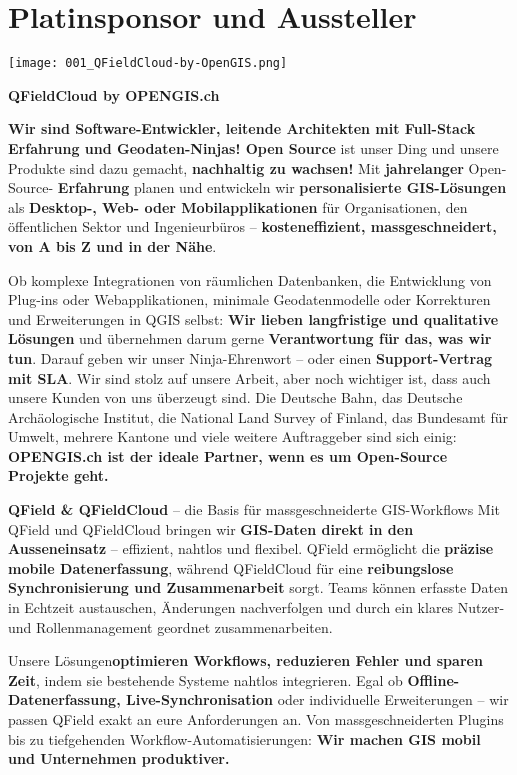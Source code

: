 \cleardoubleevenpage
\section*{Platinsponsor und Aussteller}
\begin{flushright}
\texttt{[image: 001\_QFieldCloud-by-OpenGIS.png]}
\end{flushright}
\vspace{0.5cm}

\noindent
    {\bfseries QFieldCloud by OPENGIS.ch}
    \vspace{1.0\baselineskip}
    
 \noindent   
    {\bfseries Wir sind Software-Entwickler, leitende Architekten mit Full-Stack Erfahrung und Geodaten-Ninjas!
      Open Source} ist unser Ding und unsere Produkte sind dazu gemacht,  {\bfseries nachhaltig zu wachsen!}
    Mit {\bfseries jahrelanger} Open-Source- {\bfseries Erfahrung} planen und entwickeln wir {\bfseries personalisierte GIS-Lösungen}
    als {\bfseries Desktop-, Web- oder Mobilapplikationen} für Organisationen, den öffentlichen Sektor und Ingenieurbüros –
    {\bfseries kosteneffizient, massgeschneidert, von A bis Z und in der Nähe}. 

\noindent
Ob komplexe Integrationen von räumlichen Datenbanken, die Entwicklung von Plug-ins oder Webapplikationen, minimale Geodatenmodelle
oder Korrekturen und Erweiterungen in QGIS selbst: {\bfseries Wir lieben langfristige und qualitative Lösungen} und übernehmen darum
gerne {\bfseries Verantwortung für das, was wir tun}. Darauf geben wir unser Ninja-Ehrenwort – oder einen {\bfseries Support-Vertrag mit SLA}.
\newpage
\noindent
Wir sind stolz auf unsere Arbeit, aber noch wichtiger ist, dass auch unsere Kunden von uns überzeugt sind. Die Deutsche Bahn, das Deutsche
Archäologische Institut, die National Land Survey of Finland, das Bundesamt für Umwelt, mehrere Kantone und viele weitere Auftraggeber
sind sich einig: {\bfseries OPENGIS.ch ist der ideale Partner, wenn es um Open-Source Projekte geht.}

\noindent
{\bfseries QField \& QFieldCloud} – die Basis für massgeschneiderte GIS-Workflows   
Mit QField und QFieldCloud bringen wir {\bfseries GIS-Daten direkt in den Ausseneinsatz} – effizient, nahtlos und flexibel. QField
ermöglicht die {\bfseries präzise mobile Datenerfassung}, während QFieldCloud für eine {\bfseries reibungslose Synchronisierung
  und Zusammenarbeit} sorgt. Teams können erfasste Daten in Echtzeit austauschen, Änderungen nachverfolgen und durch ein
klares Nutzer- und Rollenmanagement geordnet zusammenarbeiten.  

\noindent
Unsere Lösungen{\bfseries  optimieren Workflows, reduzieren Fehler und sparen Zeit}, indem sie bestehende Systeme nahtlos integrieren.
Egal ob {\bfseries Offline-Datenerfassung, Live-Synchronisation} oder individuelle Erweiterungen – wir passen QField exakt an eure
Anforderungen an. Von massgeschneiderten Plugins bis zu tiefgehenden Workflow-Automatisierungen:
{\bfseries Wir machen GIS mobil und Unternehmen produktiver.}

